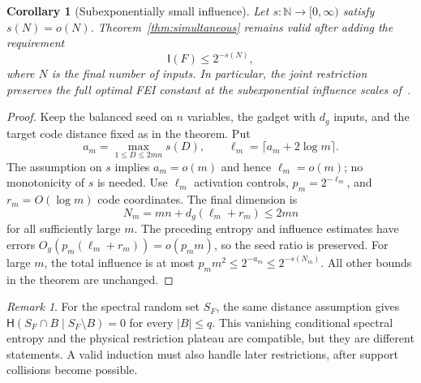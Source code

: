 \documentclass[11pt]{amsart}
\newtheorem{corollary}[theorem]{Corollary}
\theoremstyle{definition}
\theoremstyle{remark}
\newtheorem{remark}[theorem]{Remark}
\newcommand{\HH}{\mathsf H}
\newcommand{\I}{\mathsf I}
\begin{document}
\begin{corollary}[Subexponentially small influence]\label{cor:subexponential}
Let $s:\mathbb N\to[0,\infty)$ satisfy $s(N)=o(N)$. Theorem~\ref{thm:simultaneous} remains valid after adding the requirement
\[
 \I(F)\le2^{-s(N)},
\]
where $N$ is the final number of inputs. In particular, the joint restriction preserves the full optimal FEI constant at the subexponential influence scales of~\cite{Shalev18}.
\end{corollary}
\begin{proof}
Keep the balanced seed on $n$ variables, the gadget with $d_g$ inputs, and the target code distance fixed as in the theorem. Put
\[
 a_m=\max_{1\le D\le2mn}s(D),\qquad
 \ell_m=\lceil a_m+2\log m\rceil.
\]
The assumption on $s$ implies $a_m=o(m)$ and hence $\ell_m=o(m)$; no monotonicity of $s$ is needed. Use $\ell_m$ activation controls, $p_m=2^{-\ell_m}$, and $r_m=O(\log m)$ code coordinates. The final dimension is
\[
 N_m=mn+d_g(\ell_m+r_m)\le2mn
\]
for all sufficiently large $m$. The preceding entropy and influence estimates have errors $O_g(p_m(\ell_m+r_m))=o(p_m m)$, so the seed ratio is preserved. For large $m$, the total influence is at most $p_m m^2\le2^{-a_m}\le2^{-s(N_m)}$. All other bounds in the theorem are unchanged.
\end{proof}

\begin{remark}
For the spectral random set $S_F$, the same distance assumption gives
$\HH(S_F\cap B\mid S_F\setminus B)=0$ for every $|B|\le q$.
This vanishing conditional spectral entropy and the physical restriction plateau are compatible, but they are different statements. A valid induction must also handle later restrictions, after support collisions become possible.
\end{remark}






\end{document}
